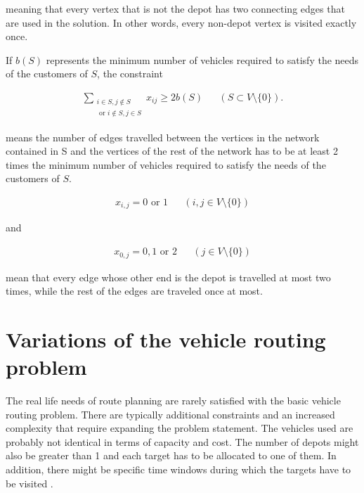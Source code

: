 \noindent
meaning that every vertex that is not the depot has two connecting edges that are used in the solution. In other words, every non-depot vertex is visited exactly once. \cite{laporte2007you}

\medskip
\noindent
If $b(S)$ represents the minimum number of vehicles required to satisfy the needs of the customers of $S$, the constraint

\begin{equation}
\begin{aligned}
\label{eq:baseformula4}
\displaystyle\sum_{\substack{i \in S, j \notin S \\ 
\text{ or } i \notin S, j \in S}} x_{ij} \geq 2b(S) && (S \subset V \setminus\{0\}).
\end{aligned}
\end{equation}

\noindent
means the number of edges travelled between the vertices in the network contained in S and the vertices of the rest of the network has to be at least 2 times the minimum number of vehicles required to satisfy the needs of the customers of $S$. \cite{laporte2007you}



\begin{equation}
\begin{aligned}
\label{eq:baseformula5}
x_{i,j} = 0 \text{ or } 1 && (i, j \in V\setminus\{0\})
\end{aligned}
\end{equation}

\noindent
and

\begin{equation}
\begin{aligned}
\label{eq:baseformula6}
x_{0,j} = 0, 1 \text{ or } 2 && (j \in V\setminus\{0\})
\end{aligned}
\end{equation}

\noindent
mean that every edge whose other end is the depot is travelled at most two times, while the rest of the edges are traveled once at most. \cite{laporte2007you}





\section{Variations of the vehicle routing problem}

The real life needs of route planning are rarely satisfied with the basic vehicle routing problem. There are typically additional constraints and an increased complexity that require expanding the problem statement. The vehicles used are probably not identical in terms of capacity and cost. The number of depots might also be greater than 1 and each target has to be allocated to one of them. \cite{salhi2014multi} In addition, there might be specific time windows during which the targets have to be visited \cite{ghoseiri2010multi}. 

